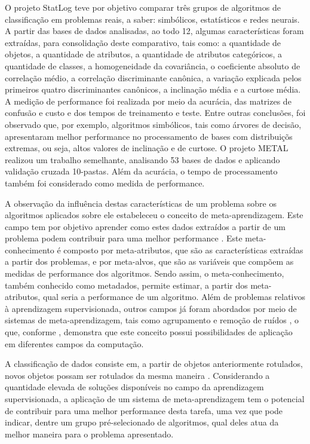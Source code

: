 \documentclass[runningheads]{llncs}
\begin{document}
O projeto StatLog \cite{statlog} teve por objetivo comparar três grupos de algoritmos de classificação em problemas reais, a saber: simbólicos, estatísticos e redes neurais. A partir das bases de dados analisadas, ao todo 12, algumas características foram extraídas, para consolidação deste comparativo, tais como: a quantidade de objetos, a quantidade de atributos, a quantidade de atributos categóricos, a quantidade de classes, a homogeneidade da covariância, o coeficiente absoluto de correlação médio, a correlação discriminante canônica, a variação explicada pelos primeiros quatro discriminantes canônicos, a inclinação média e a curtose média. A medição de performance foi realizada por meio da acurácia, das matrizes de confusão e custo e dos tempos de treinamento e teste. Entre outras conclusões, foi observado que, por exemplo, algoritmos simbólicos, tais como árvores de decisão, apresentaram melhor performance no processamento de bases com distribuiçõs extremas, ou seja, altos valores de inclinação e de curtose. O projeto METAL \cite{cross} realizou um trabalho semelhante, analisando 53 bases de dados e aplicando validação cruzada 10-pastas. Além da acurácia, o tempo de processamento também foi considerado como medida de performance.

A observação da influência destas características de um problema sobre os algoritmos aplicados sobre ele estabeleceu o conceito de meta-aprendizagem. Este campo tem por objetivo aprender como estes dados extraídos a partir de um problema podem contribuir para uma melhor performance \cite{clustering}. Este meta-conhecimento é composto por meta-atributos, que são as características extraídas a partir dos problemas, e por meta-alvos, que são as variáveis que compõem as medidas de performance dos algoritmos. Sendo assim, o meta-conhecimento, também conhecido como metadados, permite estimar, a partir dos meta-atributos, qual seria a performance de um algoritmo. Além de problemas relativos à aprendizagem supervisionada, outros campos já foram abordados por meio de sistemas de meta-aprendizagem, tais como agrupamento \cite{clustering} e remoção de ruídos \cite{noise}, o que, conforme \cite{cross}, demonstra que este conceito possui possibilidades de aplicação em diferentes campos da computação.

A classificação de dados consiste em, a partir de objetos anteriormente rotulados, novos objetos possam ser rotulados da mesma maneira \cite{kdd}. Considerando a quantidade elevada de soluções disponíveis no campo da aprendizagem supervisionada, a aplicação de um sistema de meta-aprendizagem tem o potencial de contribuir para uma melhor performance desta tarefa, uma vez que pode indicar, dentre um grupo pré-selecionado de algoritmos, qual deles atua da melhor maneira para o problema apresentado.
\end{document}
